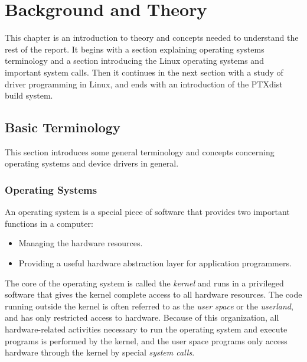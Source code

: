 \chapter{Background and Theory}

This chapter is an introduction to theory and concepts needed to understand the rest of the report. It begins with a section explaining operating systems terminology and a section introducing the Linux operating systems and important system calls. Then it continues in the next section with a study of driver programming in Linux, and ends with an introduction of the PTXdist build system.


\section{Basic Terminology}\label{basic-terminology}
This section introduces some general terminology and concepts concerning operating systems and device drivers in general.

\subsection{Operating Systems}
An operating system is a special piece of software that provides two important functions in a computer:
\begin{itemize}
  \item Managing the hardware resources.
  \item Providing a useful hardware abstraction layer for application programmers.
\end{itemize}
The core of the operating system is called the \emph{kernel} and runs in a privileged software that gives the kernel complete access to all hardware resources. The code running outside the kernel is often referred to as the \emph{user space} or the \emph{userland}, and has only restricted access to hardware. Because of this organization, all hardware-related activities necessary to run the operating system and execute programs is performed by the kernel, and the user space programs only access hardware through the kernel by special \emph{system calls}.
\cite{modern-operating-systems}

